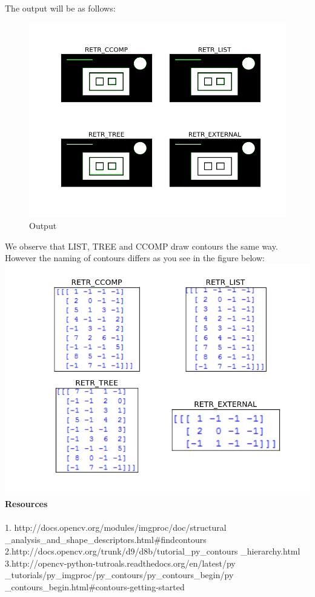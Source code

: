 \documentclass[]{article}
\begin{document}
The output will be as follows:

\begin{figure}[htbp]
\centering
\includegraphics{heir1.png}
\caption{Output}
\end{figure}

We observe that LIST, TREE and CCOMP draw contours the same way. However
the naming of contours differs as you see in the figure below:\\
\includegraphics{heir2.png} \\

\LARGE{\textbf{Resources}} \\
\\
1. http://docs.opencv.org/modules/imgproc/doc/structural
\_analysis\_and\_shape\_descriptors.html\#findcontours
2.http://docs.opencv.org/trunk/d9/d8b/tutorial\_py\_contours
\_hierarchy.html \\
3.http://opencv-python-tutroals.readthedocs.org/en/latest/py
\_tutorials/py\_imgproc/py\_contours/py\_contours\_begin/py
\_contours\_begin.html\#contours-getting-started
\end{document}
